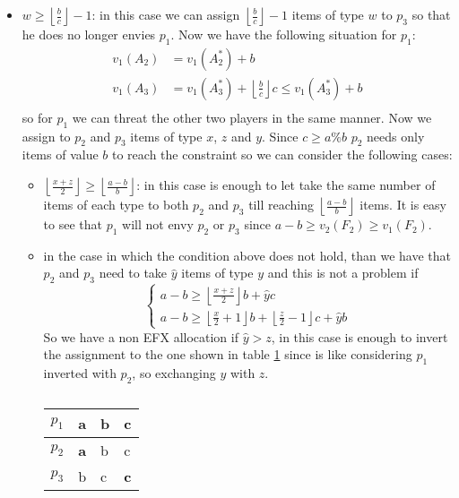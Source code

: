 \documentclass{article}
\begin{document}
\begin{itemize}
    \item $w \ge \left \lfloor \frac{b}{c}\right \rfloor - 1$: in this case we can assign $\left \lfloor \frac{b}{c}\right \rfloor - 1$ items of type $w$ to $p_3$ so that he does no longer envies $p_1$. Now we have the following situation for $p_1$:
    \begin{align*}
        v_1(A_2) &= v_1(A_2^*) + b\\
        v_1(A_3) &= v_1(A_3^*)  +\left \lfloor \frac{b}{c}\right \rfloor c \le v_1(A_3^*)  + b \\
    \end{align*}
    so for $p_1$ we can threat the other two players in the same manner. Now we assign to $p_2$ and $p_3$ items of type $x$, $z$ and $y$. Since $c \ge a\%b$ $p_2$ needs only items of value $b$ to reach the constraint so we can consider the following cases:
    \begin{itemize}
        \item $ \left \lfloor \frac{x+z}{2}\right \rfloor \ge  \left \lfloor \frac{a-b}{b}\right \rfloor$: in this case is enough to let take the same number of items of each type to both $p_2$ and $p_3$ till reaching $\left \lfloor \frac{a-b}{b}\right \rfloor$ items. It is easy to see that $p_1$ will not envy $p_2$ or $p_3$ since $a-b\ge v_2(F_2) \ge v_1(F_2)$.
        \item in the case in which the condition above does not hold, than we have that $p_2$ and $p_3$ need to take $\hat y$ items of type $y$ and this is not a problem if
        \begin{equation*}
            \begin{cases}
                a -b \ge  \left \lfloor \frac{x+z}{2}\right \rfloor b + \hat{y}c\\
                a -b \ge  \left \lfloor \frac{x}{2} + 1\right \rfloor b +  \left \lfloor \frac{z}{2} - 1\right \rfloor c + \hat{y}b
            \end{cases}
        \end{equation*}
        So we have a non EFX allocation if $\hat{y} > z$, in this case is enough to invert the assignment to the one shown in table \ref{table-3-players-aab-invert-w-greater-second-case} since is like considering $p_1$ inverted with $p_2$, so exchanging $y$ with $z$.
        \begin{table}[h]
            \centering
                \begin{tabular}{|l|l|l|l|}
                \hline
                $p_1$ & a          & \textbf{b} & c           \\ \hline
                $p_2$ & \textbf{a} & b          & c           \\ \hline
                $p_3$ & b          & c          & \textbf{c}  \\ \hline
                \end{tabular}
            \caption{}
            \label{table-3-players-aab-invert-w-greater-second-case}
        \end{table}
    \end{itemize}
    

\end{itemize}
\end{document}
